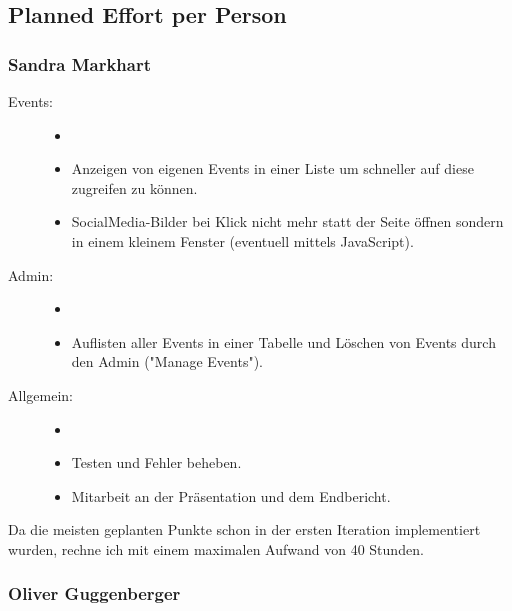 \documentclass{article}
\begin{document}
\subsection{Planned Effort per Person}

\subsubsection{Sandra Markhart}

\begin{description}
    \item[Events:]
        \begin{itemize}
        \item[]
            \item Anzeigen von eigenen Events in einer Liste um schneller auf diese zugreifen zu können.
            \item SocialMedia-Bilder bei Klick nicht mehr statt der Seite öffnen sondern in einem kleinem Fenster                    (eventuell mittels JavaScript).
        \end{itemize}
    \item[Admin:]
        \begin{itemize}
        \item[]
            \item Auflisten aller Events in einer Tabelle und Löschen von Events durch den Admin ("Manage Events"). 
        \end{itemize}
    \item[Allgemein:]
        \begin{itemize}
        \item[]
            \item Testen und Fehler beheben.
            \item Mitarbeit an der Präsentation und dem Endbericht.
        \end{itemize}
\end{description}

Da die meisten geplanten Punkte schon in der ersten Iteration implementiert wurden, rechne ich mit einem maximalen Aufwand von 40 Stunden.


\subsubsection{Oliver Guggenberger}
\end{document}
